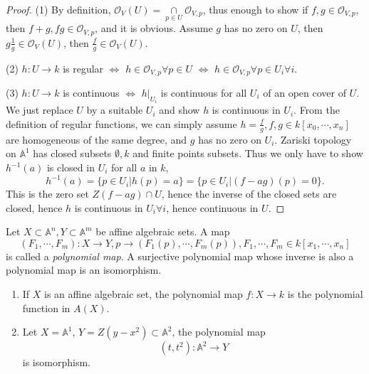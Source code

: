 \begin{proof}
	(1) By definition, $ \mathcal{O}_V(U)=\mathop{\cap}\limits_{p\in U} \mathcal{O}_{V,p} $, thus enough to show if $ f,g\in \mathcal{O}_{V,p} $, then $ f+g, fg \in \mathcal{O}_{V,p}$, and it is obvious. Assume $ g $ has no zero on $ U $, then $ g\frac{1}{g}\in \mathcal{O}_V(U) $, then $ \frac{f}{g}\in \mathcal{O}_V(U) $.

	(2) $ h:U\to k $ is regular $ \Leftrightarrow $ $ h\in \mathcal{O}_{V,p} \forall p\in U$ $ \Leftrightarrow $ $ h\in \mathcal{O}_{V,p} \forall p\in U_i \forall i$.

	(3) $ h:U\to k  $ is continuous $ \Leftrightarrow $ $ h|_{U_i} $ is continuous for all $ U_i $ of an open cover of $ U $. We just replace $ U $ by a suitable $ U_i $ and show $ h $ is continuous in $ U_i $. From the definition of regular functions, we can simply assume $ h=\frac{f}{g}, f,g\in k[x_0,\cdots,x_n] $ are homogeneous of the same degree, and $ g $ has no zero on $ U_i $. Zariski topology on $ \mathbb{A}^1 $ has closed subsets $ \emptyset,k $ and finite points subsets. Thus we only have to show $ h^{-1}(a) $ is closed in $ U_i $ for all $ a $ in $ k $,
	\begin{equation}
		h^{-1}(a)=\{ p\in U_i|h(p)=a \}= \{ p\in U_i|(f-ag)(p)=0 \}.
	\end{equation}
	This is the zero set $ Z(f-ag)\cap U $, hence the inverse of the closed sets are closed, hence $ h $ is continuous in $ U_i \forall i$, hence continuous in $ U $.
\end{proof}
\begin{definition}
	Let $ X\subset \mathbb{A}^n, Y\subset \mathbb{A}^m $ be affine algebraic sets. A map
	$$
		(F_1,\cdots,F_m):X\to Y,p\to (F_1(p),\cdots,F_m(p)),F_1,\cdots,F_m\in k[x_1,\cdots,x_n]
	$$
	is called a \textit{polynomial map}. A surjective polynomial map whose inverse is also a polynomial map is an isomorphism.
\end{definition}
\begin{example}{}
  \noindent
	\begin{enumerate}
		\item If $ X $ is an affine algebraic set, the polynomial map $ f:X\to k $ is the polynomial function in $ A(X) $.
		\item Let $ X=\mathbb{A}^1 $, $ Y=Z(y-x^2)\subset \mathbb{A}^2 $, the polynomial map
		      $$
			      (t,t^2):\mathbb{A}^2\to Y
		      $$
		      is isomorphism.
	\end{enumerate}
\end{example}
